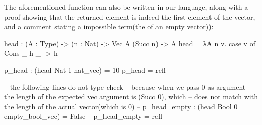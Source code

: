 The aforementioned  function can also be written in our language, along with a proof showing that the returned element is indeed the first element of the vector, and a comment stating a impossible term(the  of an empty vector)): 
\begin{piforall}
head : (A : Type) -> (n : Nat) -> Vec A (Succ n) -> A
head = λA n v. case v of {
  Cons _ h _ -> h
}

p_head : (head Nat 1 nat_vec) = 10
p_head = refl

-- the following lines do not type-check
-- because when we pass 0 as argument
-- the length of the expected vec argument is (Succ 0), which
-- does not match with the length of the actual vector(which is 0)
-- p_head_empty : (head Bool 0 empty_bool_vec) = False
-- p_head_empty = refl
\end{piforall}
